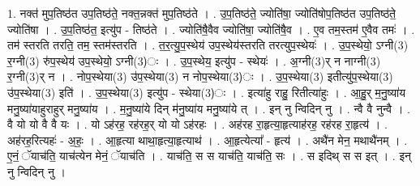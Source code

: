 \documentclass[17pt]{extarticle}
\begin{document}
1. नक्त॑ मुप॒तिष्ठ॑त उप॒तिष्ठ॑ते॒ नक्त॒न्नक्त॑ मुप॒तिष्ठ॑ते । . उ॒प॒तिष्ठ॑ते॒ ज्योति॑षा॒ ज्योति॑षोप॒तिष्ठ॑त उप॒तिष्ठ॑ते॒ ज्योति॑षा । . उ॒प॒तिष्ठ॑त॒ इत्यु॑प - तिष्ठ॑ते । . ज्योति॑षै॒वैव ज्योति॑षा॒ ज्योति॑षै॒व । . ए॒व तम॒स्तम॑ ए॒वैव तमः॑ । . तम॑ स्तरति तरति॒ तम॒ स्तम॑स्तरति । . त॒र॒त्यु॒प॒स्थेय॑ उप॒स्थेय॑स्तरति तरत्युप॒स्थेयः॑ । . उ॒प॒स्थेयो॒ ऽग्नी(3) र॒ग्नी(3) रु॑प॒स्थेय॑ उप॒स्थेयो॒ ऽग्नी(3)ः । . उ॒प॒स्थेय॒ इत्यु॑प - स्थेयः॑ । . अ॒ग्नी(3)र् न नाग्नी(3) र॒ग्नी(3)र् न । . नोप॒स्थेया(3) उ॑प॒स्थेया(3) न नोप॒स्थेया(3)ः । . उ॒प॒स्थेया(3) इतीत्यु॑प॒स्थेया(3) उ॑प॒स्थेया(3) इति॑ । . उ॒प॒स्थेया(3) इत्यु॑प - स्थेया(3)ः । . इत्या॑हु राहु॒ रितीत्या॑हुः । . आ॒हु॒र् म॒नु॒ष्या॑य मनु॒ष्या॑याहुराहुर् मनु॒ष्या॑य । . म॒नु॒ष्या॑ये दिन् म॑नु॒ष्या॑य मनु॒ष्या॑ये त् । . इन् नु न्विदिन् नु । . न्वै वै नुन्वै । . वै यो यो वै वै यः । . यो ऽह॑रह॒ रह॑रह॒र् यो यो ऽह॑रहः । . अह॑रह रा॒हृत्या॒हृत्याह॑रह॒ रह॑रह रा॒हृत्य॑ । . अह॑रह॒रित्यहः॑ - अ॒हः॒ । . आ॒हृत्या थाथा॒हृत्या॒हृत्याथ॑ । . आ॒हृत्येत्या᳚ - हृत्य॑ । . अथै॑न मेन॒ मथाथै॑नम् । . ए॒नं॒ ॅयाच॑ति॒ याच॑त्येन मेनं॒ ॅयाच॑ति । . याच॑ति॒ स स याच॑ति॒ याच॑ति॒ सः । . स इदिथ् स स इत् । . इन् नु न्विदिन् नु । \newline
\end{document}
